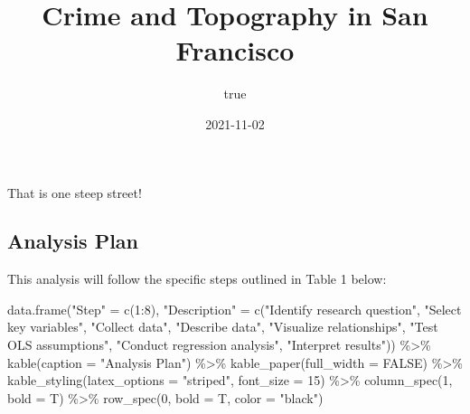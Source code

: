\documentclass[
]{article}
\title{Crime and Topography in San Francisco}
\author{true}
\date{2021-11-02}
\newenvironment{Shaded}{\begin{snugshade}}{\end{snugshade}}
\newcommand{\AttributeTok}[1]{\textcolor[rgb]{0.77,0.63,0.00}{#1}}
\newcommand{\ConstantTok}[1]{\textcolor[rgb]{0.00,0.00,0.00}{#1}}
\newcommand{\DecValTok}[1]{\textcolor[rgb]{0.00,0.00,0.81}{#1}}
\newcommand{\FunctionTok}[1]{\textcolor[rgb]{0.00,0.00,0.00}{#1}}
\newcommand{\NormalTok}[1]{#1}
\newcommand{\OtherTok}[1]{\textcolor[rgb]{0.56,0.35,0.01}{#1}}
\newcommand{\SpecialCharTok}[1]{\textcolor[rgb]{0.00,0.00,0.00}{#1}}
\newcommand{\StringTok}[1]{\textcolor[rgb]{0.31,0.60,0.02}{#1}}
\begin{document}
\maketitle

That is one steep street!

\hypertarget{analysis-plan}{%
\subsection{Analysis Plan}\label{analysis-plan}}

This analysis will follow the specific steps outlined in Table 1 below:

\begin{Shaded}
\begin{Highlighting}[]
\FunctionTok{data.frame}\NormalTok{(}\StringTok{"Step"} \OtherTok{=} \FunctionTok{c}\NormalTok{(}\DecValTok{1}\SpecialCharTok{:}\DecValTok{8}\NormalTok{),}
           \StringTok{"Description"} \OtherTok{=} \FunctionTok{c}\NormalTok{(}\StringTok{"Identify research question"}\NormalTok{, }
                             \StringTok{"Select key variables"}\NormalTok{,}
                             \StringTok{"Collect data"}\NormalTok{,}
                             \StringTok{"Describe data"}\NormalTok{,}
                             \StringTok{"Visualize relationships"}\NormalTok{,}
                             \StringTok{"Test OLS assumptions"}\NormalTok{,}
                             \StringTok{"Conduct regression analysis"}\NormalTok{,}
                             \StringTok{"Interpret results"}\NormalTok{)) }\SpecialCharTok{\%\textgreater{}\%} 
  \FunctionTok{kable}\NormalTok{(}\AttributeTok{caption =} \StringTok{"Analysis Plan"}\NormalTok{) }\SpecialCharTok{\%\textgreater{}\%}
  \FunctionTok{kable\_paper}\NormalTok{(}\AttributeTok{full\_width =} \ConstantTok{FALSE}\NormalTok{) }\SpecialCharTok{\%\textgreater{}\%}
  \FunctionTok{kable\_styling}\NormalTok{(}\AttributeTok{latex\_options =} \StringTok{"striped"}\NormalTok{,}
                \AttributeTok{font\_size =} \DecValTok{15}\NormalTok{) }\SpecialCharTok{\%\textgreater{}\%} 
  \FunctionTok{column\_spec}\NormalTok{(}\DecValTok{1}\NormalTok{, }\AttributeTok{bold =}\NormalTok{ T) }\SpecialCharTok{\%\textgreater{}\%}
  \FunctionTok{row\_spec}\NormalTok{(}\DecValTok{0}\NormalTok{, }\AttributeTok{bold =}\NormalTok{ T, }\AttributeTok{color =} \StringTok{"black"}\NormalTok{)}
\end{Highlighting}
\end{Shaded}
\end{document}
